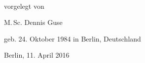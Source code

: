 \begin{titlepage}
    \begin{addmargin}[-1cm]{-3cm}
    \begin{center}
        \large  

        \hfill

        \vfill

        \begingroup
            \color{Maroon}\spacedallcaps{\myTitle} \\ \bigskip
        \endgroup

				\vspace{0.7cm}	
				vorgelegt von
				
				\vspace{0.7cm}	
				M.\,Sc. Dennis Guse
				
				geb. 24. Oktober 1984 in Berlin, Deutschland



%				
%				
%
%				
%
%				
%			



				\vspace{1cm}
				Berlin, 11. April 2016

				\myVersion				
%
%
%

        \vfill                      

    \end{center}  
  \end{addmargin}       
\end{titlepage}   